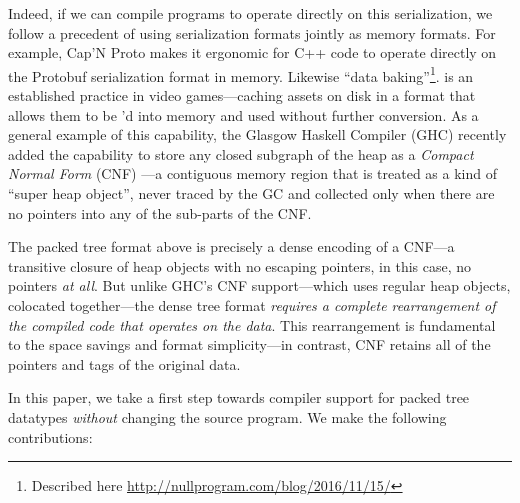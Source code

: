 \documentclass[a4paper,english]{lipics-v2016}
\begin{document}
Indeed, if we can compile programs to operate directly on this serialization, we
follow a precedent of using serialization formats jointly as memory formats.
For example, Cap'N Proto \cite{capnproto} makes it ergonomic for C++ code to operate directly
on the Protobuf serialization format in memory.  Likewise ``data baking''\footnote{Described here \url{http://nullprogram.com/blog/2016/11/15/}}.
 is an established practice in video games---caching assets on
disk in a format that allows them to be 'd into memory and used
without further conversion.  As a general example of this capability, the
Glasgow Haskell Compiler (GHC) recently added the capability to store any closed
subgraph of the heap as a {\em Compact Normal Form} (CNF) \cite{cnf-icfp15}---a
contiguous memory region that is treated as a kind of ``super heap object'', never
traced by the GC and collected only when there are no pointers into any of the
sub-parts of the CNF.

The packed tree format above is precisely a dense encoding of a CNF---a
transitive closure of heap objects with no escaping pointers, in this case, no
pointers {\em at all}.  But unlike GHC's CNF support---which uses regular heap
objects, colocated together---the dense tree format {\em requires a complete
rearrangement of the compiled code that operates on the data}. This
rearrangement is fundamental to the space savings and format
simplicity---in contrast, CNF retains all of the pointers and tags of
the original data.


In this paper, we take a first step towards compiler support for 
packed tree datatypes {\em without} changing the source program.  We make the
following contributions:

\newcommand{\calculus}{$\lambda^D_T$} %
\end{document}
